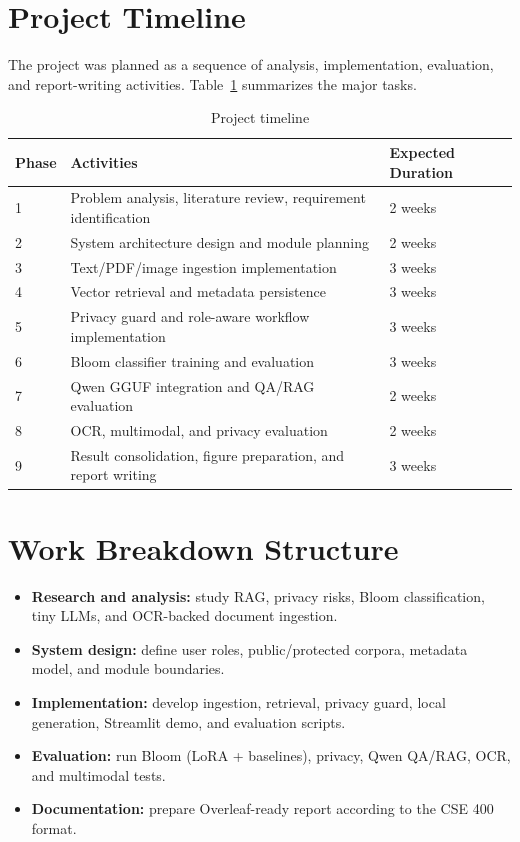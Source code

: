 \section{Project Timeline}

The project was planned as a sequence of analysis, implementation, evaluation, and report-writing activities. Table~\ref{tab:timeline_report} summarizes the major tasks.

\begin{longtable}{p{}p{}p{}}
\caption{Project timeline}\label{tab:timeline_report}\\
\toprule
\textbf{Phase} & \textbf{Activities} & \textbf{Expected Duration}\\
\midrule
1 & Problem analysis, literature review, requirement identification & 2 weeks\\
2 & System architecture design and module planning & 2 weeks\\
3 & Text/PDF/image ingestion implementation & 3 weeks\\
4 & Vector retrieval and metadata persistence & 3 weeks\\
5 & Privacy guard and role-aware workflow implementation & 3 weeks\\
6 & Bloom classifier training and evaluation & 3 weeks\\
7 & Qwen GGUF integration and QA/RAG evaluation & 2 weeks\\
8 & OCR, multimodal, and privacy evaluation & 2 weeks\\
9 & Result consolidation, figure preparation, and report writing & 3 weeks\\
\bottomrule
\end{longtable}

\section{Work Breakdown Structure}

\begin{itemize}
    \item \textbf{Research and analysis:} study RAG, privacy risks, Bloom classification, tiny LLMs, and OCR-backed document ingestion.
    \item \textbf{System design:} define user roles, public/protected corpora, metadata model, and module boundaries.
    \item \textbf{Implementation:} develop ingestion, retrieval, privacy guard, local generation, Streamlit demo, and evaluation scripts.
    \item \textbf{Evaluation:} run Bloom (LoRA + baselines), privacy, Qwen QA/RAG, OCR, and multimodal tests.
    \item \textbf{Documentation:} prepare Overleaf-ready report according to the CSE 400 format.
\end{itemize}

